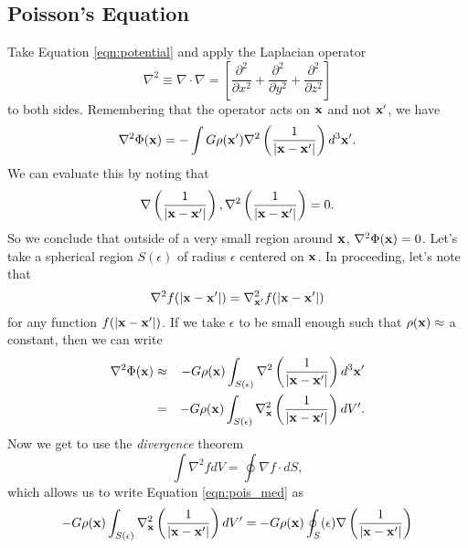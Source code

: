 \documentclass[]{article}
\begin{document}
\subsection{Poisson's Equation}

Take Equation \ref{eqn:potential} and apply the Laplacian operator 
\begin{equation}
\nabla^{2} \equiv \nabla \cdot \nabla = \left[\frac{\partial^{2}}{\partial x^{2}}+\frac{\partial^{2}}{\partial y^{2}}+\frac{\partial^{2}}{\partial z^{2}}\right]
\end{equation}
\noindent
to both sides.  Remembering that the operator acts on $\mathbf{x}$ and not $\mathbf{x}'$, we have
\begin{equation}
\label{eqn:pois_init}
\nabla^{2} \Phi(\mathbf{x}) = - \int G \rho(\mathbf{x}') \nabla^{2} \left(\frac{1}{|\mathbf{x}-\mathbf{x}'|}\right)d^{3}\mathbf{x}'.
\end{equation}
\noindent
We can evaluate this by noting that
\begin{equation}
\nabla\left(\frac{1}{|\mathbf{x} - \mathbf{x}'|}\right), \nabla^{2}\left(\frac{1}{|\mathbf{x} - \mathbf{x}'|}\right) = 0.
\end{equation}
\noindent
So we conclude that outside of a very small region around $\mathbf{x}$, $\nabla^{2}\Phi(\mathbf{x})=0$.
Let's take a spherical region $S(\epsilon)$ of radius $\epsilon$ centered on $\mathbf{x}$. In proceeding, let's 
note that 
\begin{equation}
\nabla^{2} f(|\mathbf{x}-\mathbf{x}'|) = \nabla_{\mathbf{x}'}^{2} f(|\mathbf{x}-\mathbf{x}'|)
\end{equation}
\noindent
for any function $f(|\mathbf{x} - \mathbf{x}'|)$. If we take $\epsilon$ to be small enough such 
that $\rho(\mathbf{x})\approx$ a constant, then we can write
\begin{eqnarray}
\label{eqn:pois_med}
\nabla^{2}\Phi(\mathbf{x}) &\approx& - G\rho(\mathbf{x}) \int_{S(\epsilon)} \nabla^2 \left( \frac{1}{|\mathbf{x} - \mathbf{x}'|} \right)d^{3}\mathbf{x}' \nonumber \\
&=& - G \rho(\mathbf{x})  \int_{S(\epsilon)} \nabla_{\mathbf{x}}^2 \left( \frac{1}{|\mathbf{x} - \mathbf{x}'|} \right)d V'.
\end{eqnarray}
\noindent
Now we get to use the {\it divergence} theorem
\begin{equation}
\int \nabla^{2} f dV = \oint \nabla f \cdot dS,
\end{equation}
\noindent
which allows us to write Equation \ref{eqn:pois_med} as
\begin{equation}
- G \rho(\mathbf{x})  \int_{S(\epsilon)} \nabla_{\mathbf{x}}^2 \left( \frac{1}{|\mathbf{x} - \mathbf{x}'|} \right)d V' = - G \rho(\mathbf{x}) \oint_S(\epsilon) \nabla\left(\frac{1}{|\mathbf{x}-\mathbf{x}'|}\right)
\end{equation}
\end{document}
